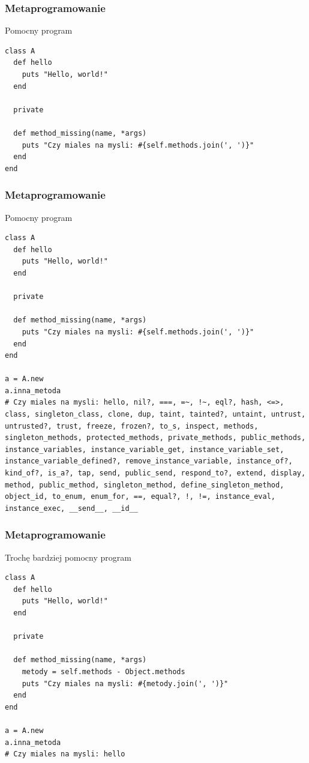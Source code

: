 \begin{frame}[fragile]
\frametitle{Metaprogramowanie}
\begin{block}{Pomocny program}
\begin{lstlisting}[style=Ruby]
class A
  def hello
    puts "Hello, world!"
  end

  private

  def method_missing(name, *args)
    puts "Czy miales na mysli: #{self.methods.join(', ')}"
  end
end
\end{lstlisting}
\end{block}
\end{frame}
\begin{frame}[fragile]
\frametitle{Metaprogramowanie}
\begin{block}{Pomocny program}
\begin{lstlisting}[style=Ruby,basicstyle=\tiny\ttfamily]
class A
  def hello
    puts "Hello, world!"
  end

  private

  def method_missing(name, *args)
    puts "Czy miales na mysli: #{self.methods.join(', ')}"
  end
end

a = A.new
a.inna_metoda
# Czy miales na mysli: hello, nil?, ===, =~, !~, eql?, hash, <=>, class, singleton_class, clone, dup, taint, tainted?, untaint, untrust, untrusted?, trust, freeze, frozen?, to_s, inspect, methods, singleton_methods, protected_methods, private_methods, public_methods, instance_variables, instance_variable_get, instance_variable_set, instance_variable_defined?, remove_instance_variable, instance_of?, kind_of?, is_a?, tap, send, public_send, respond_to?, extend, display, method, public_method, singleton_method, define_singleton_method, object_id, to_enum, enum_for, ==, equal?, !, !=, instance_eval, instance_exec, __send__, __id__
\end{lstlisting}
\end{block}
\end{frame}
\begin{frame}[fragile]
\frametitle{Metaprogramowanie}
\begin{block}{Trochę bardziej pomocny program}
\begin{lstlisting}[style=Ruby,basicstyle=\tiny\ttfamily]
class A
  def hello
    puts "Hello, world!"
  end

  private

  def method_missing(name, *args)
    metody = self.methods - Object.methods
    puts "Czy miales na mysli: #{metody.join(', ')}"
  end
end

a = A.new
a.inna_metoda
# Czy miales na mysli: hello
\end{lstlisting}
\end{block}
\end{frame}

